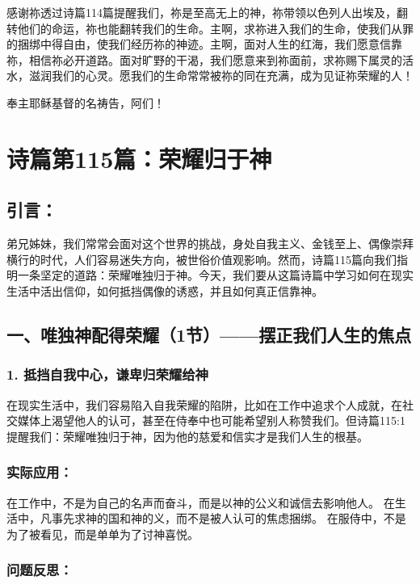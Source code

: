 \documentclass[a4paper, 12pt]{article}
\begin{document}
感谢祢透过诗篇114篇提醒我们，祢是至高无上的神，祢带领以色列人出埃及，翻转他们的命运，祢也能翻转我们的生命。主啊，求祢进入我们的生命，使我们从罪的捆绑中得自由，使我们经历祢的神迹。主啊，面对人生的红海，我们愿意信靠祢，相信祢必开道路。面对旷野的干渴，我们愿意来到祢面前，求祢赐下属灵的活水，滋润我们的心灵。愿我们的生命常常被祢的同在充满，成为见证祢荣耀的人！

奉主耶稣基督的名祷告，阿们！
\newpage
\section{诗篇第115篇：荣耀归于神}

\subsection*{引言：}
弟兄姊妹，我们常常会面对这个世界的挑战，身处自我主义、金钱至上、偶像崇拜横行的时代，人们容易迷失方向，被世俗价值观影响。然而，诗篇115篇向我们指明一条坚定的道路：荣耀唯独归于神。今天，我们要从这篇诗篇中学习如何在现实生活中活出信仰，如何抵挡偶像的诱惑，并且如何真正信靠神。

\subsection*{一、唯独神配得荣耀（1节）——摆正我们人生的焦点}

\subsubsection*{1. 抵挡自我中心，谦卑归荣耀给神}
在现实生活中，我们容易陷入自我荣耀的陷阱，比如在工作中追求个人成就，在社交媒体上渴望他人的认可，甚至在侍奉中也可能希望别人称赞我们。但诗篇115:1提醒我们：荣耀唯独归于神，因为他的慈爱和信实才是我们人生的根基。

\subsubsection*{实际应用：}

在工作中，不是为自己的名声而奋斗，而是以神的公义和诚信去影响他人。
在生活中，凡事先求神的国和神的义，而不是被人认可的焦虑捆绑。
在服侍中，不是为了被看见，而是单单为了讨神喜悦。
\subsubsection*{问题反思：}
\end{document}
